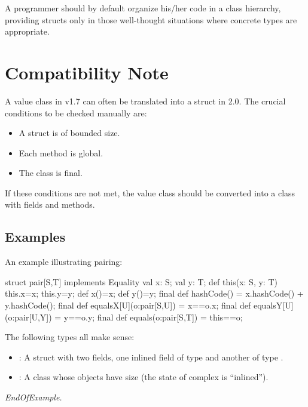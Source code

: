  A programmer should by default organize his/her code in a class
 hierarchy, providing structs only in those well-thought situations
 where concrete types are appropriate.

\section{Compatibility Note}

A value class in \Xten{} v1.7 can often be translated into a struct in \Xten{} 2.0. The crucial conditions to be checked manually are: \begin{itemize}
\item  A struct is of bounded size. 
\item  Each method is global. 
\item  The class is final.
\end{itemize}
 

If these conditions are not met, the value class should be converted
into a class with  fields and methods.

\subsection{Examples}

An example illustrating pairing:
\begin{x10}
struct pair[S,T] implements Equality {
  val x: S;
  val y: T;
  def this(x: S, y: T) {
    this.x=x;
    this.y=y;
  }
  def x()=x;
  def y()=y;  
  final def hashCode() = x.hashCode() + y.hashCode();
  final def equalsX[U](o:pair[S,U]) = x==o.x;
  final def equalsY[U](o:pair[U,Y]) = y==o.y;
  final def equals(o:pair[S,T]) = this==o;
}
\end{x10}

The following types all make sense: 
\begin{itemize}
\item {}: A struct with two fields, one inlined field of type  and another of type . 
\item {}: A class whose objects have size
   (the state of complex is
  ``inlined'').
\end{itemize}
\emph{EndOfExample.}

